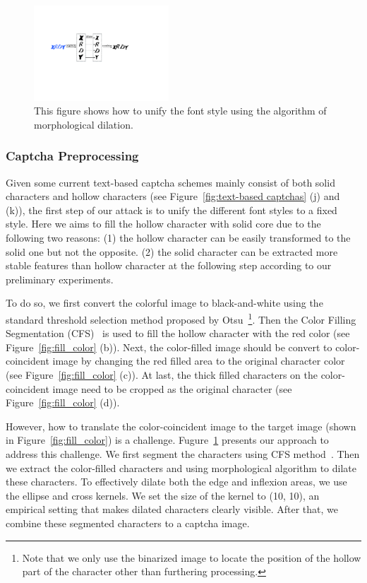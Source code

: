\begin{figure}
  \centering
  \includegraphics[width=0.45\textwidth]{fig/captcha_preprocessing/preprocessing.pdf}
  \caption{This figure shows how to unify the font style using the algorithm of morphological dilation.}
  \label{fig: preprocessing}
\end{figure}

\subsubsection{Captcha Preprocessing}
Given some current text-based captcha schemes mainly consist of both solid characters and hollow characters (see Figure~\ref{fig:text-based captchas} (j) and (k)), the first step of our attack is to unify the different font styles to a fixed style. Here we aims to fill the hollow character with solid core due to the following two reasons:
(1) the hollow character can be easily transformed to the solid one but not the opposite.
(2) the solid character can be extracted more stable features than hollow character at the following step according to our preliminary experiments.

To do so, we first convert the colorful image to black-and-white using the standard threshold selection method proposed by Otsu~\cite{Ostu1979A}\footnote{Note that we only use the binarized image to locate the position of the hollow part of the character other than furthering processing.}.
Then the Color Filling Segmentation (CFS)~\cite{Yan2008A} is used to fill the hollow character with the red color (see Figure~\ref{fig:fill_color} (b)). Next, the color-filled image should be convert to color-coincident image by changing the red filled area to the original character color (see Figure~\ref{fig:fill_color} (c)). At last, the thick filled characters on the color-coincident image need to be cropped as the original character (see Figure~\ref{fig:fill_color} (d)).

However, how to translate the color-coincident image to the target image (shown in Figure~\ref{fig:fill_color}) is a challenge. Fugure~\ref{fig: preprocessing} presents our approach to address this challenge. We first segment the characters using CFS method~\cite{Yan2008A}.  Then we extract the color-filled characters and using morphological algorithm to dilate these characters. To effectively dilate both the edge and inflexion areas, we use the ellipse and cross kernels. We set the size of the kernel to (10, 10), an empirical setting that makes dilated characters clearly visible. After that, we combine these segmented characters to a captcha image.

